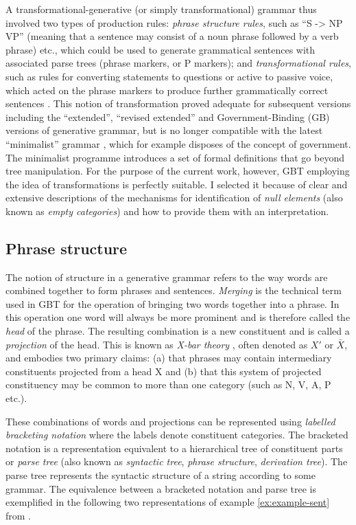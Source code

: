     A transformational-generative (or simply transformational) grammar thus involved two types of production rules: \textit{phrase structure rules}, such as ``S -> NP VP'' (meaning that a sentence may consist of a noun phrase followed by a verb phrase) etc., which could be used to generate grammatical sentences with associated parse trees (phrase markers, or P markers); and \textit{transformational rules}, such as rules for converting statements to questions or active to passive voice, which acted on the phrase markers to produce further grammatically correct sentences \citep[59-66]{Bach1966}. This notion of transformation proved adequate for subsequent versions including the ``extended'', ``revised extended'' and Government-Binding (GB) versions of generative grammar, but is no longer compatible with the latest ``minimalist'' grammar \citep{Chomsky93}, which for example disposes of the concept of government. The minimalist programme introduces a set of formal definitions that go beyond tree manipulation. For the purpose of the current work, however, GBT employing the idea of transformations is perfectly suitable. I selected it because of clear and extensive descriptions of the mechanisms for identification of \textit{null elements} (also known as \textit{empty categories}) and how to provide them with an interpretation. 

\subsection{Phrase structure}
    The notion of structure in a generative grammar refers to the way words are combined together to form phrases and sentences. \textit{Merging} is the technical term used in GBT for the operation of bringing two words together into a phrase. In this operation one word will always be more prominent and is therefore called the \textit{head} of the phrase. The resulting combination is a new constituent and is called a \textit{projection} of the head. This is known as \textit{X-bar theory} \citep{Jackendoff77-book}, often denoted as $X'$ or $\bar{X}$, and embodies two primary claims: (a) that phrases may contain intermediary constituents projected from a head X and (b) that this system of projected constituency may be common to more than one category (such as N, V, A, P etc.).

    These combinations of words and projections can be represented using \textit{labelled bracketing notation} where the labels denote constituent categories. The bracketed notation is a representation equivalent to a hierarchical tree of constituent parts or \textit{parse tree} (also known as \textit{syntactic tree}, \textit{phrase structure}, \textit{derivation tree}). The parse tree represents the syntactic structure of a string according to some grammar. The equivalence between a bracketed notation and parse tree is exemplified in the following two representations of example \ref{ex:example-sent} from \citep[83]{Haegeman1991}.

